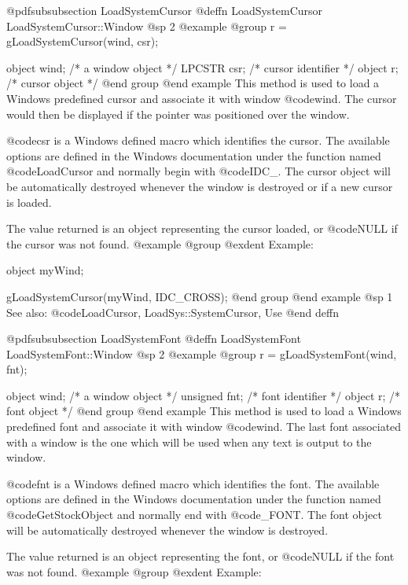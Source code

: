 @pdfsubsubsection {LoadSystemCursor}
@deffn {LoadSystemCursor} LoadSystemCursor::Window
@sp 2
@example
@group
r = gLoadSystemCursor(wind, csr);

object   wind;  /*  a window object    */
LPCSTR   csr;   /*  cursor identifier  */
object   r;     /*  cursor object      */
@end group
@end example
This method is used to load a Windows predefined cursor and associate it
with window @code{wind}.  The cursor would then be displayed if the pointer
was positioned over the window.

@code{csr} is a Windows defined macro which identifies the cursor.  The
available options are defined in the Windows documentation under the
function named @code{LoadCursor} and normally begin with @code{IDC_}.  The
cursor object will be automatically destroyed whenever the window is
destroyed or if a new cursor is loaded.

The value returned is an object representing the cursor loaded, or
@code{NULL} if the cursor was not found.
@example
@group
@exdent Example:

object  myWind;

gLoadSystemCursor(myWind, IDC_CROSS);
@end group
@end example
@sp 1
See also:  @code{LoadCursor, LoadSys::SystemCursor, Use}
@end deffn











@pdfsubsubsection {LoadSystemFont}
@deffn {LoadSystemFont} LoadSystemFont::Window
@sp 2
@example
@group
r = gLoadSystemFont(wind, fnt);

object   wind;  /*  a window object  */
unsigned fnt;   /*  font identifier  */
object   r;     /*  font object      */
@end group
@end example
This method is used to load a Windows predefined font and associate it
with window @code{wind}.  The last font associated with a window is the
one which will be used when any text is output to the window.

@code{fnt} is a Windows defined macro which identifies the font.  The
available options are defined in the Windows documentation under the
function named @code{GetStockObject} and normally end with @code{_FONT}.
The font object will be automatically destroyed whenever the window is
destroyed.

The value returned is an object representing the font, or
@code{NULL} if the font was not found.
@example
@group
@exdent Example:

